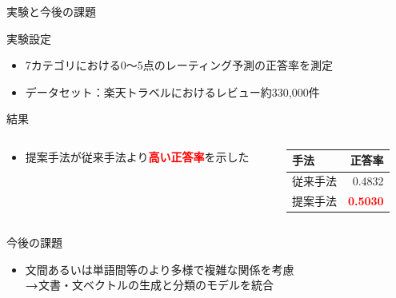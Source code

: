 \documentclass[aspectratio=43,unicode,10pt]{beamer}
\newcommand{\fire}[1]{\textcolor{red}{\textbf{#1}}}
\newcommand{\arrow}{\textcolor{ttiblue}{\textbf{→}}\hspace{1ex}}
\begin{document}
\begin{frame}{実験と今後の課題}{}
  \begin{block}{実験設定}
    \begin{itemize}
      \item 7カテゴリにおける0〜5点のレーティング予測の正答率を測定
      \item データセット：楽天トラベルにおけるレビュー約330,000件
    \end{itemize}
  \end{block}
  \begin{block}{結果}
    \begin{columns}[onlytextwidth,t]
      \begin{column}{0.6\linewidth}
        \vspace{-0.5em} %
        \begin{itemize}
          \item 提案手法が従来手法より\fire{高い正答率}を示した
        \end{itemize}
      \end{column}
      \begin{column}{0.4\linewidth}
        \vspace{-1.5em} %
        \begin{table}
          \begin{tabular}{l | r}
            手法 & 正答率 \\
            \hline
            従来手法 & 0.4832 \\
            提案手法 & \fire{0.5030} \\
          \end{tabular}
        \end{table}
      \end{column}
    \end{columns}
  \end{block}
  \vspace{-1em} %
  \begin{block}{今後の課題}
    \begin{itemize}
      \item 文間あるいは単語間等のより多様で複雑な関係を考慮 \\
            \arrow 文書・文ベクトルの生成と分類のモデルを統合
    \end{itemize}
  \end{block}
\end{frame}
\end{document}
